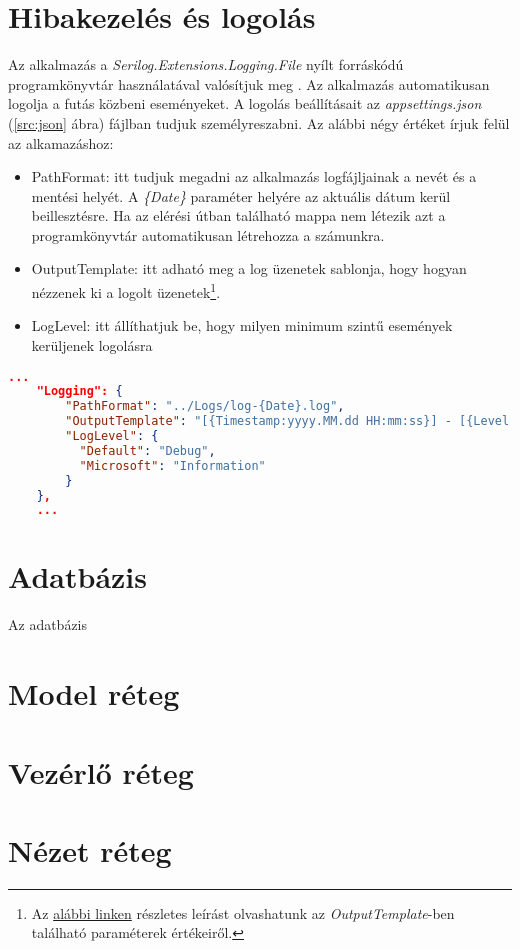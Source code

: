 \section{Hibakezelés és logolás}
\label{sec:error-handling-log}
Az alkalmazás a \emph{Serilog.Extensions.Logging.File} nyílt forráskódú programkönyvtár használatával valósítjuk meg \cite{SERILOG}. Az alkalmazás automatikusan logolja a futás közbeni eseményeket. A logolás beállításait az \emph{appsettings.json} (\ref{src:json} ábra) fájlban tudjuk személyreszabni. Az alábbi négy értéket írjuk felül az alkamazáshoz:
\begin{itemize}
	\item PathFormat: itt tudjuk megadni az alkalmazás logfájljainak a nevét és a mentési helyét. A \emph{\{Date\}} paraméter helyére az aktuális dátum kerül beillesztésre. Ha az elérési útban található mappa nem létezik azt a programkönyvtár automatikusan létrehozza a számunkra.
	\item OutputTemplate: itt adható meg a log üzenetek sablonja, hogy hogyan nézzenek ki a logolt üzenetek\footnote{Az \href{https://github.com/serilog/serilog/wiki/Formatting-Output}{alábbi linken} részletes leírást olvashatunk az \emph{OutputTemplate}-ben található paraméterek értékeiről.}.
	\item LogLevel: itt állíthatjuk be, hogy milyen minimum szintű események kerüljenek logolásra\cite{LogLevels}
\end{itemize}
\begin{lstlisting}[language=json]
	...
	"Logging": {
		"PathFormat": "../Logs/log-{Date}.log",
		"OutputTemplate": "[{Timestamp:yyyy.MM.dd HH:mm:ss}] - [{Level:u}] - {Message}{NewLine}{Exception}",
		"LogLevel": {
		  "Default": "Debug",
		  "Microsoft": "Information"
		}
	},
	...
\end{lstlisting}
\section{Adatbázis}
\label{sec:database}
Az adatbázis
\section{Model réteg}
\label{sec:model}
\section{Vezérlő réteg}
\label{sec:controller}
\section{Nézet réteg}
\label{sec:view}
